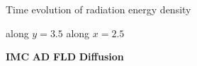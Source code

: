 \documentclass{beamer}
\begin{document}
\begin{frame}{Time evolution of radiation energy density}
  
\begin{center}
  along $y=3.5$ \qquad
  \qquad along $x=2.5$

  \textcolor[rgb]{0,0,0}{\textbf{IMC}}\quad
  \textcolor[rgb]{0.1,0.9,0.1}{\textbf{AD}}\quad
  \textcolor[rgb]{0,0,1}{\textbf{FLD}}\quad
  \textcolor[rgb]{1,0,0}{\textbf{Diffusion}}
\end{center}
\end{frame}
\end{document}
